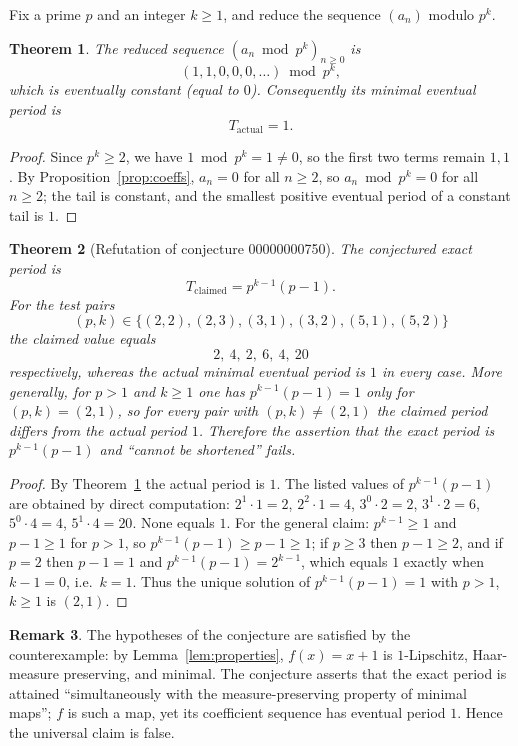 \documentclass[11pt]{article}
\newtheorem{theorem}{Theorem}
\theoremstyle{definition}
\newtheorem{remark}[theorem]{Remark}
\begin{document}
Fix a prime $p$ and an integer $k \ge 1$, and reduce the sequence
$(a_n)$ modulo $p^k$.

\begin{theorem}\label{thm:period}
The reduced sequence $(a_n \bmod p^k)_{n\ge 0}$ is
\[
  (1,1,0,0,0,\dots) \bmod p^k ,
\]
which is eventually constant (equal to $0$). Consequently its minimal eventual
period is
\[
  T_{\mathrm{actual}} = 1 .
\]
\end{theorem}

\begin{proof}
Since $p^k \ge 2$, we have $1 \bmod p^k = 1 \ne 0$, so the first two terms
remain $1,1$. By Proposition~\ref{prop:coeffs}, $a_n = 0$ for all $n \ge 2$,
so $a_n \bmod p^k = 0$ for all $n\ge 2$; the tail is constant, and the smallest
positive eventual period of a constant tail is $1$.
\end{proof}

\begin{theorem}[Refutation of conjecture 00000000750]\label{thm:refute}
The conjectured exact period is
\[
  T_{\mathrm{claimed}} = p^{k-1}(p-1).
\]
For the test pairs
\[
  (p,k) \in \{(2,2),(2,3),(3,1),(3,2),(5,1),(5,2)\}
\]
the claimed value equals
\[
  2,\ 4,\ 2,\ 6,\ 4,\ 20
\]
respectively, whereas the actual minimal eventual period is $1$ in every case.
More generally, for $p>1$ and $k\ge 1$ one has $p^{k-1}(p-1) = 1$ only for
$(p,k)=(2,1)$, so for every pair with $(p,k)\ne(2,1)$ the claimed period
differs from the actual period $1$. Therefore the assertion that the exact
period is $p^{k-1}(p-1)$ and ``cannot be shortened'' fails.
\end{theorem}

\begin{proof}
By Theorem~\ref{thm:period} the actual period is $1$. The listed values of
$p^{k-1}(p-1)$ are obtained by direct computation:
$2^1\cdot1=2$, $2^2\cdot1=4$, $3^0\cdot2=2$, $3^1\cdot2=6$,
$5^0\cdot4=4$, $5^1\cdot4=20$. None equals $1$. For the general claim:
$p^{k-1}\ge 1$ and $p-1\ge 1$ for $p>1$, so $p^{k-1}(p-1)\ge p-1 \ge 1$; if
$p\ge 3$ then $p-1\ge 2$, and if $p=2$ then $p-1=1$ and $p^{k-1}(p-1)=2^{k-1}$,
which equals $1$ exactly when $k-1=0$, i.e.\ $k=1$. Thus the unique solution of
$p^{k-1}(p-1)=1$ with $p>1$, $k\ge1$ is $(2,1)$.
\end{proof}

\begin{remark}
The hypotheses of the conjecture are satisfied by the counterexample: by
Lemma~\ref{lem:properties}, $f(x)=x+1$ is $1$-Lipschitz, Haar-measure
preserving, and minimal. The conjecture asserts that the exact period is
attained ``simultaneously with the measure-preserving property of minimal
maps''; $f$ is such a map, yet its coefficient sequence has eventual period
$1$. Hence the universal claim is false.
\end{remark}
\end{document}
